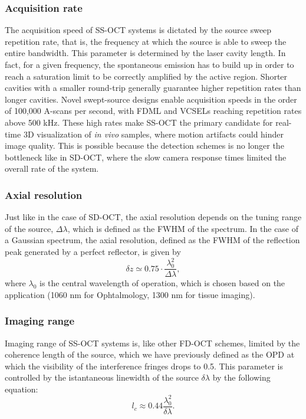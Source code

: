 \subsubsection{Acquisition rate}

The acquisition speed of \ac{SS-OCT} systems is dictated by the source sweep repetition rate, that is, the frequency at which the source is able to sweep the entire bandwidth. This parameter is determined by the laser cavity length. In fact, for a given frequency, the spontaneous emission has to build up in order to reach a saturation limit to be correctly amplified by the active region. Shorter cavities with a smaller round-trip generally guarantee higher repetition rates than longer cavities. Novel swept-source designs enable acquisition speeds in the order of 100,000 A-scans per second, with \ac{FDML} and \acp{VCSEL} reaching repetition rates above 500 kHz. These high rates make \ac{SS-OCT} the primary candidate for real-time 3D visualization of \emph{in vivo} samples, where motion artifacts could hinder image quality. This is possible because the detection schemes is no longer the bottleneck like in \ac{SD-OCT}, where the slow camera response times limited the overall rate of the system. 

\subsubsection{Axial resolution}
Just like in the case of \ac{SD-OCT}, the axial resolution depends on the tuning range of the source, $\Delta \lambda$, which is defined as the \ac{FWHM} of the spectrum. In the case of a Gaussian spectrum, the axial resolution, defined as the \ac{FWHM} of the reflection peak generated by a perfect reflector, is given by
\begin{equation}\label{eq:ss-axial-resolution}
	\delta z \simeq 0.75 \cdot \frac{\lambda_0^2}{\Delta \lambda},
\end{equation}
where $\lambda_0$ is the central wavelength of operation, which is chosen based on the application (1060 nm for Ophtalmology, 1300 nm for tissue imaging). 

\subsubsection{Imaging range}
Imaging range of \ac{SS-OCT} systems is, like other \ac{FD-OCT} schemes, limited by the coherence length of the source, which we have previously defined as the \ac{OPD} at which the visibility of the interference fringes drops to 0.5. This parameter is controlled by the istantaneous linewidth of the source $\delta \lambda$ by the following equation:
\begin{equation}
	l_c \approx 0.44 \frac{\lambda_0^2}{\delta \lambda}.
\end{equation}

